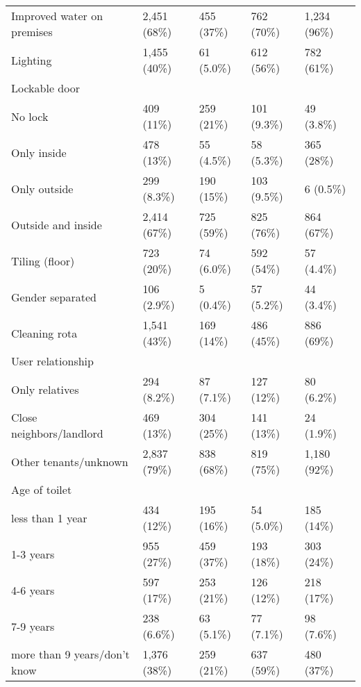 \begin{table}[ht]
\begin{threeparttable}
{\begin{tabular}[t]{lllll}
Improved water on premises & 2,451 (68\%) & 455 (37\%) & 762 (70\%) & 1,234 (96\%)\\
Lighting & 1,455 (40\%) & 61 (5.0\%) & 612 (56\%) & 782 (61\%)\\
Lockable door &  &  &  & \\
\hspace{1em}No lock & 409 (11\%) & 259 (21\%) & 101 (9.3\%) & 49 (3.8\%)\\
\hspace{1em}Only inside & 478 (13\%) & 55 (4.5\%) & 58 (5.3\%) & 365 (28\%)\\
\hspace{1em}Only outside & 299 (8.3\%) & 190 (15\%) & 103 (9.5\%) & 6 (0.5\%)\\
\hspace{1em}Outside and inside & 2,414 (67\%) & 725 (59\%) & 825 (76\%) & 864 (67\%)\\
Tiling (floor) & 723 (20\%) & 74 (6.0\%) & 592 (54\%) & 57 (4.4\%)\\
Gender separated & 106 (2.9\%) & 5 (0.4\%) & 57 (5.2\%) & 44 (3.4\%)\\
Cleaning rota & 1,541 (43\%) & 169 (14\%) & 486 (45\%) & 886 (69\%)\\
User relationship &  &  &  & \\
\hspace{1em}Only relatives & 294 (8.2\%) & 87 (7.1\%) & 127 (12\%) & 80 (6.2\%)\\
\hspace{1em}Close neighbors/landlord & 469 (13\%) & 304 (25\%) & 141 (13\%) & 24 (1.9\%)\\
\hspace{1em}Other tenants/unknown & 2,837 (79\%) & 838 (68\%) & 819 (75\%) & 1,180 (92\%)\\
Age of toilet &  &  &  & \\
\hspace{1em}less than 1 year & 434 (12\%) & 195 (16\%) & 54 (5.0\%) & 185 (14\%)\\
\hspace{1em}1-3 years & 955 (27\%) & 459 (37\%) & 193 (18\%) & 303 (24\%)\\
\hspace{1em}4-6 years & 597 (17\%) & 253 (21\%) & 126 (12\%) & 218 (17\%)\\
\hspace{1em}7-9 years & 238 (6.6\%) & 63 (5.1\%) & 77 (7.1\%) & 98 (7.6\%)\\
\hspace{1em}more than 9 years/don't know & 1,376 (38\%) & 259 (21\%) & 637 (59\%) & 480 (37\%)\\

\end{tabular}}
\end{threeparttable}
\end{table}
